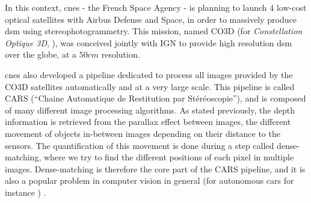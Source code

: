 In this context, \acrshort{cnes} - the French Space Agency - is planning to launch 4 low-cost optical satellites with Airbus Defense and Space, in order to massively produce \acrshort{dsm} using stereophotogrammetry. This mission, named CO3D (for \textit{Constellation Optique 3D}, \cite{melet_co3d_2020}), was conceived jointly with IGN to provide high resolution \acrshort{dsm} over the globe, at a $50cm$ resolution.

\acrshort{cnes} also developed a pipeline dedicated to process all images provided by the CO3D satellites automatically and at a very large scale. This pipeline is called CARS (``Chaine Automatique de Restitution par Stéréoscopie''), and is composed of many different image processing algorithms. As stated previously, the depth information is retrieved from the parallax effect between images, \ie the different movement of objects in-between images depending on their distance to the sensors. The quantification of this movement is done during a step called dense-matching, where we try to find the different positions of each pixel in multiple images. Dense-matching is therefore the core part of the CARS pipeline, and it is also a popular problem in computer vision in general (for autonomous cars for instance \cite{geiger_are_2012}) .

